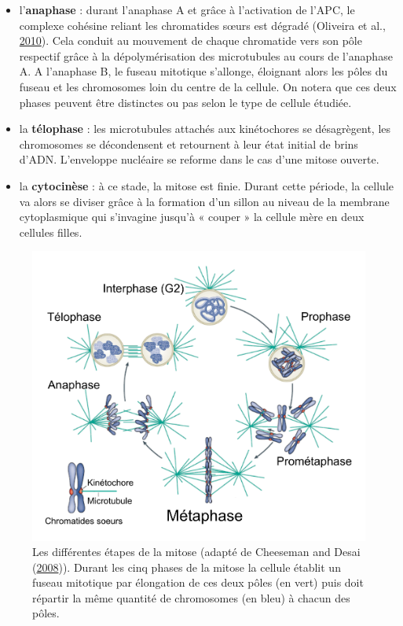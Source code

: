 \documentclass[12pt,a4paper,twoside,openright]{book}
\begin{document}
\begin{itemize}
\item
  l'\textbf{anaphase} : durant l'anaphase A et grâce à l'activation de
  l'APC, le complexe cohésine reliant les chromatides sœurs est dégradé
  (Oliveira et al., \hyperref[ref-Oliveira2010]{2010}). Cela conduit au
  mouvement de chaque chromatide vers son pôle respectif grâce à la
  dépolymérisation des microtubules au cours de l'anaphase A. A
  l'anaphase B, le fuseau mitotique s'allonge, éloignant alors les pôles
  du fuseau et les chromosomes loin du centre de la cellule. On notera
  que ces deux phases peuvent être distinctes ou pas selon le type de
  cellule étudiée.
\item
  la \textbf{télophase} : les microtubules attachés aux kinétochores se
  désagrègent, les chromosomes se décondensent et retournent à leur état
  initial de brins d'ADN. L'enveloppe nucléaire se reforme dans le cas
  d'une mitose ouverte.
\item
  la \textbf{cytocinèse} : à ce stade, la mitose est finie. Durant cette
  période, la cellule va alors se diviser grâce à la formation d'un
  sillon au niveau de la membrane cytoplasmique qui s'invagine jusqu'à «
  couper » la cellule mère en deux cellules filles.
\end{itemize}

\begin{figure}[htbp]
\centering
\includegraphics{figures/intro/mitosis.png}
\caption[Les différentes étapes de la mitose]{\label{fig:mitosis}Les
différentes étapes de la mitose (adapté de Cheeseman and Desai
(\hyperref[ref-Cheeseman2008]{2008})). Durant les cinq phases de la
mitose la cellule établit un fuseau mitotique par élongation de ces deux
pôles (en vert) puis doit répartir la même quantité de chromosomes (en
bleu) à chacun des pôles.}
\end{figure}
\end{document}
